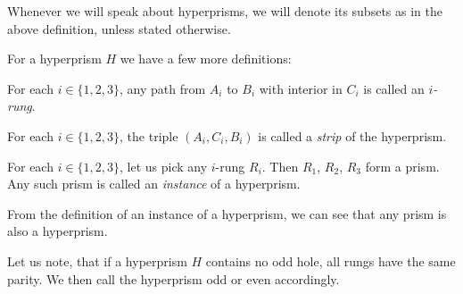 
Whenever we will speak about hyperprisms, we will denote its subsets as in the above definition, unless stated otherwise.

For a hyperprism $H$ we have a few more definitions:

\begin{defnTwo}
  For each $i \in \{1, 2, 3\}$, any path from $A_i$ to $B_i$ with interior in $C_i$ is called an \emph{$i$-rung}.
\end{defnTwo}

\begin{defnTwo}
  For each $i \in \{1, 2, 3\}$, the triple $(A_i, C_i, B_i)$ is called a \emph{strip} of the hyperprism.
\end{defnTwo}

\begin{defnTwo}
  For each $i \in \{1, 2, 3\}$, let us pick any $i$-rung $R_i$. Then $R_1$, $R_2$, $R_3$ form a prism. Any such prism is called an \emph{instance} of a hyperprism.
\end{defnTwo}

From the definition of an instance of a hyperprism, we can see that any prism is also a hyperprism.

Let us note, that if a hyperprism $H$ contains no odd hole, all rungs have the same parity. We then call the hyperprism odd or even accordingly.

